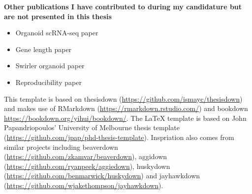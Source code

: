 \documentclass[11pt,a4paper,titlepage,twoside,openright]{style/unimelbthesis}
\theoremstyle{definition}
\theoremstyle{definition}
\theoremstyle{definition}
\theoremstyle{remark}
\begin{document}
\begin{frontmatter}
\begin{preface}
    \textbf{Other publications I have contributed to during my candidature but are not presented in this thesis}
    
    \begin{itemize}
    \tightlist
    \item
      Organoid scRNA-seq paper
    \item
      Gene length paper
    \item
      Swirler organoid paper
    \item
      Reproducibility paper
    \end{itemize}
  \end{preface}


  \begin{acknowledgements}
    This template is based on thesisdown (\url{https://github.com/ismayc/thesisdown}) and makes use of RMarkdown (\url{https://rmarkdown.rstudio.com/}) and bookdown \url{https://bookdown.org/yihui/bookdown/}. The LaTeX template is based on John Papandriopoulos' University of Melbourne thesis template (\url{https://github.com/jpap/phd-thesis-template}). Inspriation also comes from similar projects including beaverdown (\url{https://github.com/zkamvar/beaverdown}), aggidown (\url{https://github.com/ryanpeek/aggiedown}), huskydown (\url{https://github.com/benmarwick/huskydown}) and jayhawkdown (\url{https://github.com/wjakethompson/jayhawkdown}).
  \end{acknowledgements}


  \hypersetup{linkcolor=black}
  \setcounter{tocdepth}{2}
  \tableofcontents


  \listoftables


  \listoffigures



\end{frontmatter}

%
\end{document}
